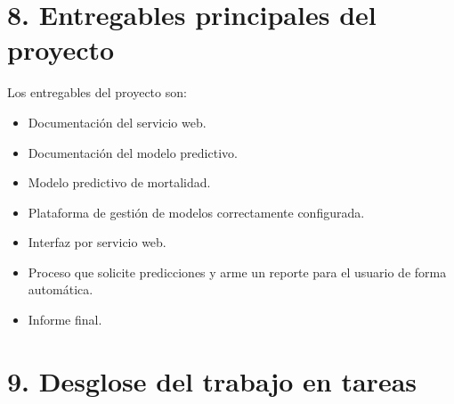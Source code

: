\documentclass[
11pt, %
]{charter}
\begin{document}
\section{8. Entregables principales del proyecto}
\label{sec:entregables}

Los entregables del proyecto son:

\begin{itemize}
	\item Documentación del servicio web.
	\item Documentación del modelo predictivo. 
	\item Modelo predictivo de mortalidad.
	\item Plataforma de gestión de modelos correctamente configurada.
	\item Interfaz por servicio web.
	\item Proceso que solicite predicciones y arme un reporte para el usuario de forma automática.
	\item Informe final.
\end{itemize}

\section{9. Desglose del trabajo en tareas}
\label{sec:wbs}
\end{document}

